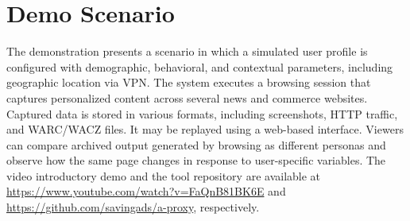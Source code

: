 \documentclass[sigconf]{acmart}
\begin{document}
\section{Demo Scenario} The demonstration presents a scenario in which a simulated user profile is configured with demographic, behavioral, and contextual parameters, including geographic location via VPN. The system executes a browsing session that captures personalized content across several news and commerce websites. Captured data is stored in various formats, including screenshots, HTTP traffic, and WARC/WACZ files. It may be replayed using a web-based interface. Viewers can compare archived output generated by browsing as different personas and observe how the same page changes in response to user-specific variables. The video introductory demo and the tool repository are available at \url{https://www.youtube.com/watch?v=FaQnB81BK6E} and \url{https://github.com/savingads/a-proxy}, respectively.




\end{document}

